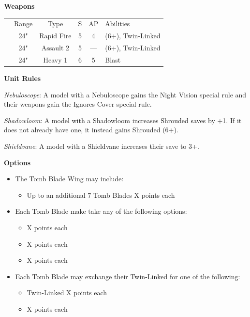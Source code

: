 \begin{minipage}[t]{0.72\textwidth}
	\vspace*{2em}
	\textbf{Weapons}
	
	\begin{tabular}{m{95 pt} *{4}{c} >{\raggedright\arraybackslash}p{130pt}}
		& Range & Type & S & AP & Abilities \\
		\quickref{Gauss Blaster} & 24" & Rapid Fire & 5 & 4 & \quickref{Gauss} (6+), Twin-Linked \\
		\quickref{Tesla Carbine} & 24" & Assault 2 & 5 & — & \quickref{Tesla} (6+), Twin-Linked \\
		\quickref{Particle Beamer} & 24" & Heavy 1 & 6 & 5 & Blast \\
	\end{tabular}
	
	\vspace*{2em}
	\textbf{Unit Rules}
	
	\textit{Nebuloscope}: A model with a Nebuloscope gains the Night Vision special rule and their weapons gain the Ignores Cover special rule.
	
	\textit{Shadowloom}: A model with a Shadowloom increases Shrouded saves by +1. If it does not already have one, it instead gains Shrouded (6+).
	
	\textit{Shieldvane}: A model with a Shieldvane increases their save to 3+.
	
	\vspace*{2em}
	\textbf{Options}
	\begin{itemize}
		\item The Tomb Blade Wing may include:
		\begin{itemize}
			\item Up to an additional 7 Tomb Blades \dotfill X points each
		\end{itemize}
		\item Each Tomb Blade make take any of the following options:
		\begin{itemize}
			\item {} \dotfill X points each
			\item {} \dotfill X points each
			\item {} \dotfill X points each
		\end{itemize}
		\item Each Tomb Blade may exchange their Twin-Linked  for one of the following:
		\begin{itemize}
			\item Twin-Linked  \dotfill X points each
			\item {} \dotfill X points each
		\end{itemize}
	\end{itemize}
\end{minipage}
